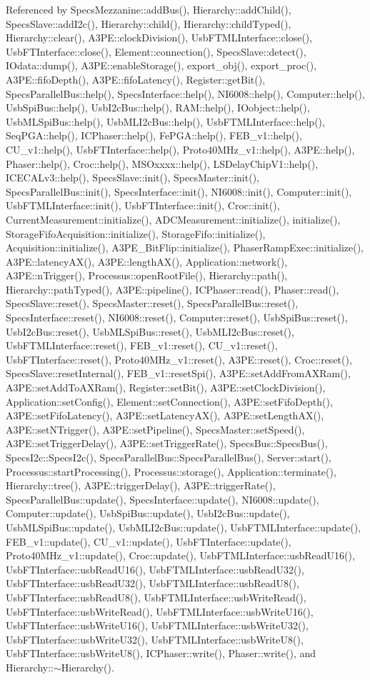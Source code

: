 Referenced by SpecsMezzanine::addBus(), Hierarchy::addChild(), SpecsSlave::addI2c(), Hierarchy::child(), Hierarchy::childTyped(), Hierarchy::clear(), A3PE::clockDivision(), UsbFTMLInterface::close(), UsbFTInterface::close(), Element::connection(), SpecsSlave::detect(), IOdata::dump(), A3PE::enableStorage(), export\_\-obj(), export\_\-proc(), A3PE::fifoDepth(), A3PE::fifoLatency(), Register::getBit(), SpecsParallelBus::help(), SpecsInterface::help(), NI6008::help(), Computer::help(), UsbSpiBus::help(), UsbI2cBus::help(), RAM::help(), IOobject::help(), UsbMLSpiBus::help(), UsbMLI2cBus::help(), UsbFTMLInterface::help(), SeqPGA::help(), ICPhaser::help(), FePGA::help(), FEB\_\-v1::help(), CU\_\-v1::help(), UsbFTInterface::help(), Proto40MHz\_\-v1::help(), A3PE::help(), Phaser::help(), Croc::help(), MSOxxxx::help(), LSDelayChipV1::help(), ICECALv3::help(), SpecsSlave::init(), SpecsMaster::init(), SpecsParallelBus::init(), SpecsInterface::init(), NI6008::init(), Computer::init(), UsbFTMLInterface::init(), UsbFTInterface::init(), Croc::init(), CurrentMeasurement::initialize(), ADCMeasurement::initialize(), initialize(), StorageFifoAcquisition::initialize(), StorageFifo::initialize(), Acquisition::initialize(), A3PE\_\-BitFlip::initialize(), PhaserRampExec::initialize(), A3PE::latencyAX(), A3PE::lengthAX(), Application::network(), A3PE::nTrigger(), Processus::openRootFile(), Hierarchy::path(), Hierarchy::pathTyped(), A3PE::pipeline(), ICPhaser::read(), Phaser::read(), SpecsSlave::reset(), SpecsMaster::reset(), SpecsParallelBus::reset(), SpecsInterface::reset(), NI6008::reset(), Computer::reset(), UsbSpiBus::reset(), UsbI2cBus::reset(), UsbMLSpiBus::reset(), UsbMLI2cBus::reset(), UsbFTMLInterface::reset(), FEB\_\-v1::reset(), CU\_\-v1::reset(), UsbFTInterface::reset(), Proto40MHz\_\-v1::reset(), A3PE::reset(), Croc::reset(), SpecsSlave::resetInternal(), FEB\_\-v1::resetSpi(), A3PE::setAddFromAXRam(), A3PE::setAddToAXRam(), Register::setBit(), A3PE::setClockDivision(), Application::setConfig(), Element::setConnection(), A3PE::setFifoDepth(), A3PE::setFifoLatency(), A3PE::setLatencyAX(), A3PE::setLengthAX(), A3PE::setNTrigger(), A3PE::setPipeline(), SpecsMaster::setSpeed(), A3PE::setTriggerDelay(), A3PE::setTriggerRate(), SpecsBus::SpecsBus(), SpecsI2c::SpecsI2c(), SpecsParallelBus::SpecsParallelBus(), Server::start(), Processus::startProcessing(), Processus::storage(), Application::terminate(), Hierarchy::tree(), A3PE::triggerDelay(), A3PE::triggerRate(), SpecsParallelBus::update(), SpecsInterface::update(), NI6008::update(), Computer::update(), UsbSpiBus::update(), UsbI2cBus::update(), UsbMLSpiBus::update(), UsbMLI2cBus::update(), UsbFTMLInterface::update(), FEB\_\-v1::update(), CU\_\-v1::update(), UsbFTInterface::update(), Proto40MHz\_\-v1::update(), Croc::update(), UsbFTMLInterface::usbReadU16(), UsbFTInterface::usbReadU16(), UsbFTMLInterface::usbReadU32(), UsbFTInterface::usbReadU32(), UsbFTMLInterface::usbReadU8(), UsbFTInterface::usbReadU8(), UsbFTMLInterface::usbWriteRead(), UsbFTInterface::usbWriteRead(), UsbFTMLInterface::usbWriteU16(), UsbFTInterface::usbWriteU16(), UsbFTMLInterface::usbWriteU32(), UsbFTInterface::usbWriteU32(), UsbFTMLInterface::usbWriteU8(), UsbFTInterface::usbWriteU8(), ICPhaser::write(), Phaser::write(), and Hierarchy::$\sim$Hierarchy().


